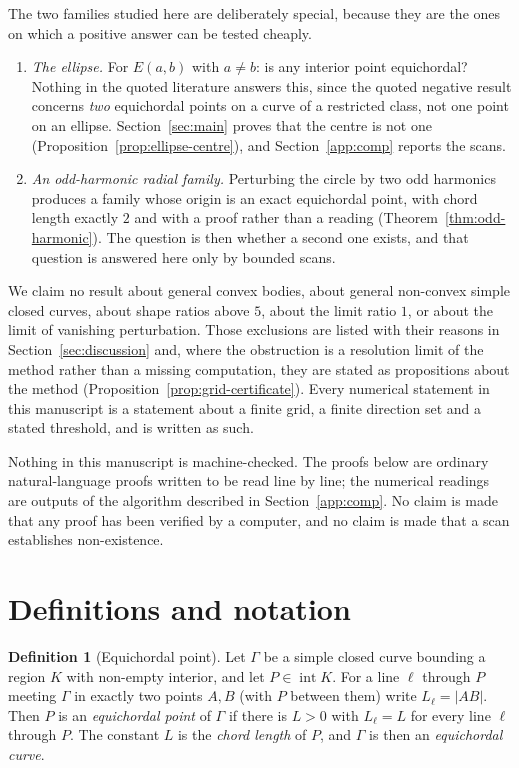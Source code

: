 \documentclass[11pt]{article}
\theoremstyle{definition}
\newtheorem{definition}[theorem]{Definition}
\theoremstyle{remark}
\begin{document}
The two families studied here are deliberately special, because they are the ones on which a positive answer can
be tested cheaply.
\begin{enumerate}
\item \emph{The ellipse.} For $E(a,b)$ with $a\neq b$: is any interior point equichordal? Nothing in the quoted
literature answers this, since the quoted negative result concerns \emph{two} equichordal points on a curve of a
restricted class, not one point on an ellipse. Section~\ref{sec:main} proves that the centre is not one
(Proposition~\ref{prop:ellipse-centre}), and Section~\ref{app:comp} reports the scans.
\item \emph{An odd-harmonic radial family.} Perturbing the circle by two odd harmonics produces a family whose
origin is an exact equichordal point, with chord length exactly $2$ and with a proof rather than a reading
(Theorem~\ref{thm:odd-harmonic}). The question is then whether a second one exists, and that question is answered
here only by bounded scans.
\end{enumerate}
We claim no result about general convex bodies, about general non-convex simple closed curves, about shape ratios
above $5$, about the limit ratio $1$, or about the limit of vanishing perturbation. Those exclusions are listed
with their reasons in Section~\ref{sec:discussion} and, where the obstruction is a resolution limit of the
method rather than a missing computation, they are stated as propositions about the method
(Proposition~\ref{prop:grid-certificate}). Every numerical statement in this manuscript is a statement about a
finite grid, a finite direction set and a stated threshold, and is written as such.

Nothing in this manuscript is machine-checked. The proofs below are ordinary natural-language proofs written to
be read line by line; the numerical readings are outputs of the algorithm described in
Section~\ref{app:comp}. No claim is made that any proof has been verified by a computer, and no claim is made
that a scan establishes non-existence.

\section{Definitions and notation}\label{sec:defs}

\begin{definition}[Equichordal point]\label{def:eqp}
Let $\Gamma$ be a simple closed curve bounding a region $K$ with non-empty interior, and let $P\in\operatorname{int}K$.
For a line $\ell$ through $P$ meeting $\Gamma$ in exactly two points $A,B$ (with $P$ between them) write
$L_\ell=|AB|$. Then $P$ is an \emph{equichordal point} of $\Gamma$ if there is $L>0$ with $L_\ell=L$ for every
line $\ell$ through $P$. The constant $L$ is the \emph{chord length} of $P$, and $\Gamma$ is then an
\emph{equichordal curve}.
\end{definition}
\end{document}
